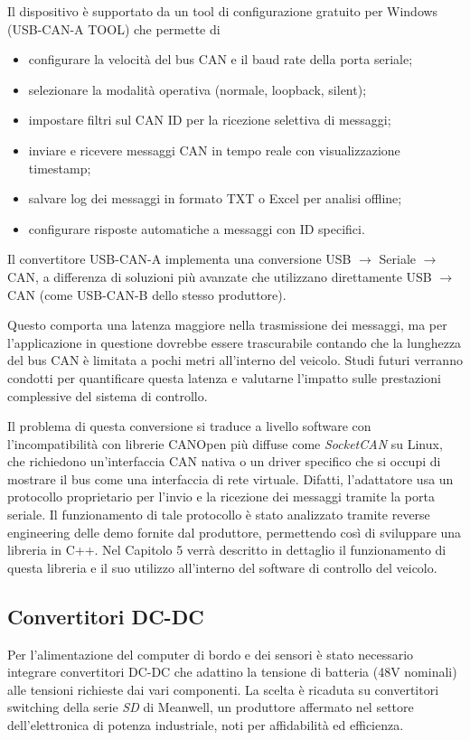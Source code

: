 Il dispositivo è supportato da un tool di configurazione gratuito per Windows (USB-CAN-A TOOL) che permette di
\begin{itemize}
    \item configurare la velocità del bus CAN e il baud rate della porta seriale;
    \item selezionare la modalità operativa (normale, loopback, silent);
    \item impostare filtri sul CAN ID per la ricezione selettiva di messaggi;
    \item inviare e ricevere messaggi CAN in tempo reale con visualizzazione timestamp;
    \item salvare log dei messaggi in formato TXT o Excel per analisi offline;
    \item configurare risposte automatiche a messaggi con ID specifici.
\end{itemize}

Il convertitore USB-CAN-A implementa una conversione USB $\rightarrow$ Seriale $\rightarrow$ CAN, a differenza di soluzioni più avanzate che utilizzano direttamente USB $\rightarrow$ CAN (come USB-CAN-B dello stesso produttore).
\begin{note}
    Questo comporta una latenza maggiore nella trasmissione dei messaggi, ma per l'applicazione in questione dovrebbe essere trascurabile contando che la lunghezza del bus CAN è limitata a pochi metri all'interno del veicolo. Studi futuri verranno condotti per quantificare questa latenza e valutarne l'impatto sulle prestazioni complessive del sistema di controllo.
\end{note}
Il problema di questa conversione si traduce a livello software con l'incompatibilità con librerie CANOpen più diffuse come \textit{SocketCAN} su Linux, che richiedono un'interfaccia CAN nativa o un driver specifico che si occupi di mostrare il bus come una interfaccia di rete virtuale. Difatti, l'adattatore usa un protocollo proprietario per l'invio e la ricezione dei messaggi tramite la porta seriale. Il funzionamento di tale protocollo è stato analizzato tramite reverse engineering delle demo fornite dal produttore, permettendo così di sviluppare una libreria in C++. Nel Capitolo 5 verrà descritto in dettaglio il funzionamento di questa libreria e il suo utilizzo all'interno del software di controllo del veicolo.

\subsection{Convertitori DC-DC}
Per l'alimentazione del computer di bordo e dei sensori è stato necessario integrare convertitori DC-DC che adattino la tensione di batteria (48V nominali) alle tensioni richieste dai vari componenti. La scelta è ricaduta su convertitori switching della serie \textit{SD} di Meanwell, un produttore affermato nel settore dell'elettronica di potenza industriale, noti per affidabilità ed efficienza.

